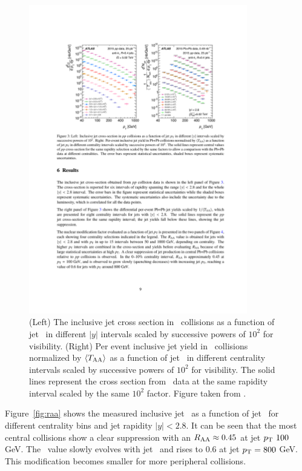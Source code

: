 \begin{figure}[htbp]
\begin{center}
\includegraphics[width=0.85\textwidth]{figures/jetMeasurements/jetYields}
\caption{(Left) The inclusive jet cross section in \pp\ collisions as a function of jet \pt\ in different $|y|$ intervals scaled by successive powers of $10^2$ for visibility.
(Right) Per event inclusive jet yield in \pbpb\ collisions normalized by $\langle \mbox{$T_{\mathrm{AA}}$} \rangle$ as a function of jet \pt\ in different centrality intervals scaled by successive powers of $10^2$ for visibility.
The solid lines represent the cross section from \pp\ data at the same rapidity interval scaled by the same $10^2$ factor.
 Figure taken from \cite{2019108}.}
\label{fig:jet_yields}
\end{center}
\end{figure}


Figure~\ref{fig:raa} shows the measured inclusive jet \RAA\ as a function of jet \pt\ for different centrality bins and jet rapidity $|y| < 2.8$.
It can be seen that the most central collisions show a clear suppression with an $\mbox{$R_{\rm AA}$} \approx 0.45$ at jet $\mbox{$p_{\mathrm{T}}$}\ 100$ GeV.
The \RAA\ value slowly evolves with jet \pt\ and rises to 0.6 at jet $\mbox{$p_{\mathrm{T}}$} = 800$ GeV.
This modification becomes smaller for more peripheral collisions.


